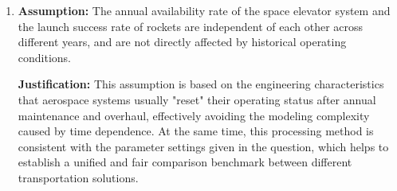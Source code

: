 \begin{enumerate}
\item
\textbf{Assumption:}  
The annual availability rate of the space elevator system and the launch success rate of rockets are independent of each other across different years, and are not directly affected by historical operating conditions.

\textbf{Justification:}  
This assumption is based on the engineering characteristics that aerospace systems usually "reset" their operating status after annual maintenance and overhaul, effectively avoiding the modeling complexity caused by time dependence. 
At the same time, this processing method is consistent with the parameter settings given in the question, which helps to establish a unified and fair comparison benchmark between different transportation solutions.
\end{enumerate}
